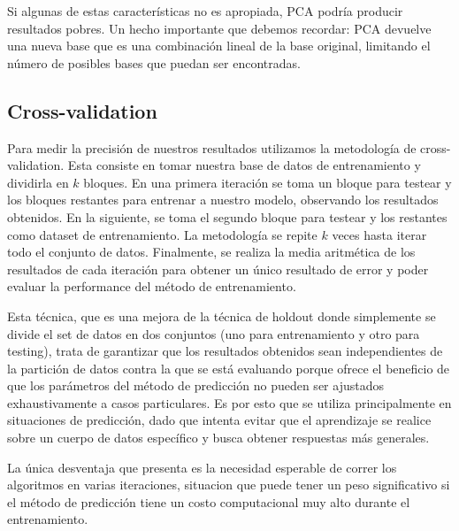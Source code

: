 Si algunas de estas características no es apropiada, PCA podría producir resultados pobres.
Un hecho importante que debemos recordar: PCA devuelve una nueva base que es una combinación lineal de la base original, limitando el número de posibles bases que puedan ser encontradas.

\subsection{Cross-validation}
Para medir la precisión de nuestros resultados utilizamos la metodología de cross-validation. Esta consiste en tomar nuestra base de datos de entrenamiento y dividirla en $k$ bloques. En una primera iteración se toma un bloque para testear y los bloques restantes para entrenar a nuestro modelo, observando los resultados obtenidos. En la siguiente, se toma el segundo bloque para testear y los restantes como dataset de entrenamiento. La metodología se repite $k$ veces hasta iterar todo el conjunto de datos. Finalmente, se realiza la media aritmética de los resultados de cada iteración para obtener un único resultado de error y poder evaluar la performance del método de entrenamiento.


Esta técnica, que es una mejora de la técnica de holdout donde simplemente se divide el set de datos en dos conjuntos (uno para entrenamiento y otro para testing), trata de garantizar que los resultados obtenidos sean independientes de la partición de datos contra la que se está evaluando porque ofrece el beneficio de que los parámetros del método de predicción no pueden ser ajustados exhaustivamente a casos particulares. Es por esto que se utiliza principalmente en situaciones de predicción, dado que intenta evitar que el aprendizaje se realice sobre un cuerpo de datos específico y busca obtener respuestas más generales.


La única desventaja que presenta es la necesidad esperable de correr los algoritmos en varias iteraciones, situacion que puede tener un peso significativo si el método de predicción tiene un costo computacional muy alto durante el entrenamiento. 

